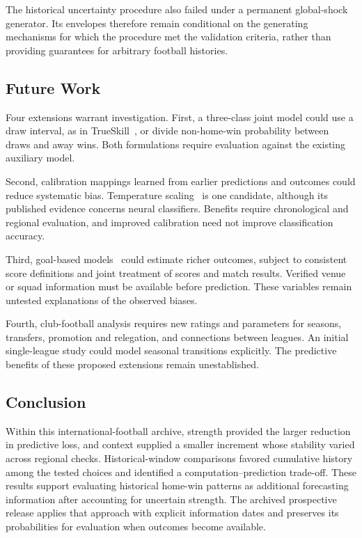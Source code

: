The historical uncertainty procedure also failed under a permanent global-shock generator. Its envelopes therefore remain conditional on the generating mechanisms for which the procedure met the validation criteria, rather than providing guarantees for arbitrary football histories.

\subsection{Future Work}

Four extensions warrant investigation. First, a three-class joint model could use a draw interval, as in TrueSkill~\citep{herbrich2006trueskill}, or divide non-home-win probability between draws and away wins. Both formulations require evaluation against the existing auxiliary model.

Second, calibration mappings learned from earlier predictions and outcomes could reduce systematic bias. Temperature scaling~\citep{guo2017calibration} is one candidate, although its published evidence concerns neural classifiers. Benefits require chronological and regional evaluation, and improved calibration need not improve classification accuracy.

Third, goal-based models~\citep{dixon1997scores} could estimate richer outcomes, subject to consistent score definitions and joint treatment of scores and match results. Verified venue or squad information must be available before prediction. These variables remain untested explanations of the observed biases.

Fourth, club-football analysis requires new ratings and parameters for seasons, transfers, promotion and relegation, and connections between leagues. An initial single-league study could model seasonal transitions explicitly. The predictive benefits of these proposed extensions remain unestablished.

\subsection{Conclusion}

Within this international-football archive, strength provided the larger reduction in predictive loss, and context supplied a smaller increment whose stability varied across regional checks. Historical-window comparisons favored cumulative history among the tested choices and identified a computation--prediction trade-off. These results support evaluating historical home-win patterns as additional forecasting information after accounting for uncertain strength. The archived prospective release applies that approach with explicit information dates and preserves its probabilities for evaluation when outcomes become available.
